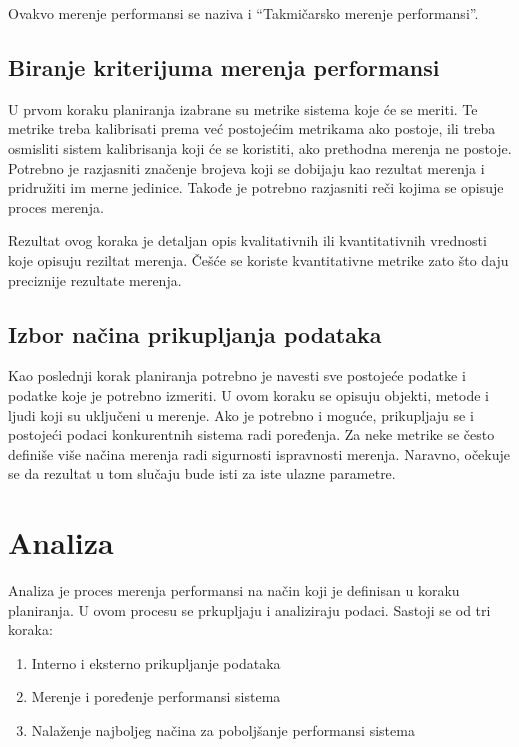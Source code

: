 \documentclass[12pt]{report}
\begin{document}
Ovakvo merenje performansi se naziva i ``Takmičarsko merenje performansi''.

\subsection{Biranje kriterijuma merenja performansi}
U prvom koraku planiranja izabrane su metrike sistema koje će se meriti. Te metrike treba kalibrisati prema već postojećim metrikama ako postoje, ili treba osmisliti sistem kalibrisanja koji će se koristiti, ako prethodna merenja ne postoje. Potrebno je razjasniti značenje brojeva koji se dobijaju kao rezultat merenja i pridružiti im merne jedinice. Takođe je potrebno razjasniti reči kojima se opisuje proces merenja.

Rezultat ovog koraka je detaljan opis kvalitativnih ili kvantitativnih vrednosti koje opisuju reziltat merenja. Češće se koriste kvantitativne metrike zato što daju preciznije rezultate merenja.

\subsection{Izbor načina prikupljanja podataka}\label{sec:izbor_nacina_prikupljanja_podataka}
Kao poslednji korak planiranja potrebno je navesti sve postojeće podatke i podatke koje je potrebno izmeriti. U ovom koraku se opisuju objekti, metode i ljudi koji su uključeni u merenje. Ako je potrebno i moguće, prikupljaju se i postojeći podaci konkurentnih sistema radi poređenja. Za neke metrike se često definiše više načina merenja radi sigurnosti ispravnosti merenja. Naravno, očekuje se da rezultat u tom slučaju bude isti za iste ulazne parametre.

\section{Analiza}
Analiza je proces merenja performansi na način koji je definisan u koraku planiranja. U ovom procesu se prkupljaju i analiziraju podaci. Sastoji se od tri koraka:
\begin{samepage}
    \begin{enumerate}
        \item Interno i eksterno prikupljanje podataka
        \item Merenje i poređenje performansi sistema
        \item Nalaženje najboljeg načina za poboljšanje performansi sistema
    \end{enumerate}
\end{samepage}
\end{document}
